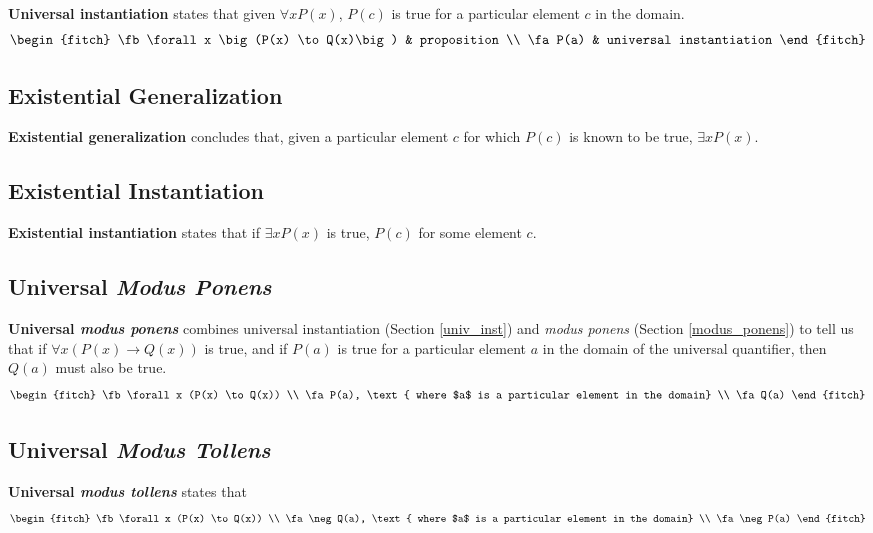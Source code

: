 \textbf{Universal instantiation}  states that given $\forall x P(x)$, $P(c)$ is
true for a particular element $c$ in the domain.
\begin{equation}
  \begin{fitch}
    \fb \forall x \big(P(x) \to Q(x)\big) & proposition \\
    \fa P(a) & universal instantiation
  \end{fitch}
  \label{eq:univ_inst}
\end{equation}

\subsection{Existential Generalization}

\textbf{Existential generalization} concludes
that, given a particular element $c$ for which $P(c)$ is known to be true, $\exists x P(x)$.

\subsection{Existential Instantiation}

\textbf{Existential instantiation} states that if
$\exists x P(x)$ is true, $P(c)$ for some element $c$.

\subsection{Universal \emph{Modus Ponens}}

\textbf{Universal \emph{modus ponens}} combines universal instantiation
(Section \ref{univ_inst}) and \emph{modus ponens} (Section \ref{modus_ponens}) to
tell us that if $\forall x (P(x) \to Q(x) )$ is true, and if $P(a)$ is true for a
particular element $a$ in the domain of the universal quantifier, then $Q(a)$ must
also be true.
\begin{equation}
  \begin{fitch}
    \fb \forall x (P(x) \to Q(x)) \\
    \fa P(a), \text{ where $a$ is a particular element in the domain} \\
    \fa Q(a)
  \end{fitch}
  \label{eq:univ_mod_pon}
\end{equation}

\subsection{Universal \emph{Modus Tollens}}

\textbf{Universal \emph{modus tollens}} states that
\begin{equation}
  \begin{fitch}
    \fb \forall x (P(x) \to Q(x)) \\
    \fa \neg Q(a), \text{ where $a$ is a particular element in the domain} \\
    \fa \neg P(a)
  \end{fitch}
  \label{eq:univ_mod_tol}
\end{equation}

